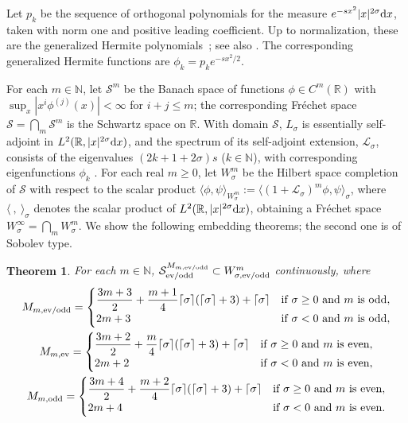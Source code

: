 \documentclass[11pt]{article}
\newtheorem{Theorem}{Theorem}[section]
\newcommand{\R}{\mathbb{R}}
\newcommand{\N}{\mathbb{N}}
\newcommand{\LL}{\mathcal{L}}
\renewcommand{\SS}{\mathcal{S}}
\begin{document}
Let $p_k$ be the sequence of orthogonal polynomials for the measure $e^{-sx^2}|x|^{2\sigma}{\rm d}x$, taken with norm one and positive leading coef\/f\/icient. Up to normalization, these are the generalized Hermite polynomials~\cite[p.~380, Problem~25]{Szego1975}; see also \cite{Chihara1955,Chihara1978,DickinsonWarsi1963,DuttaChatterjeaMore1975,Rosenblum1994,Rosler1998}. The corresponding generalized Hermite functions are $\phi_k=p_ke^{-sx^2/2}$.

For each $m\in\N$, let $\SS^m$ be the Banach space of functions $\phi\in C^m(\R)$ with \mbox{$\sup_x|x^i\phi^{(j)}(x)|\!<\!\infty$} for $i+j\le m$; the corresponding Fr\'echet space $\SS=\bigcap_m\SS^m$ is the Schwartz space on $\R$. With domain $\SS$, $L_\sigma$ is essentially self-adjoint in $L^2(\R,|x|^{2\sigma}{\rm d}x)$, and the spectrum of its self-adjoint extension, $\LL_\sigma$, consists of the eigenvalues $(2k+1+2\sigma)s$ ($k\in\N$), with corresponding eigenfunctions $\phi_k$  \cite{Rosenblum1994}. For each real $m\ge0$, let $W_\sigma^m$ be the Hilbert space completion of $\SS$ with respect to the scalar product $\langle\phi,\psi\rangle_{W_\sigma^m}:=\langle(1+\LL_\sigma)^m\phi,\psi\rangle_\sigma$, where $\langle\ ,\ \rangle_\sigma$ denotes the scalar product of $L^2(\R,|x|^{2\sigma}{\rm d}x)$, obtaining a Fr\'echet space $W_\sigma^\infty=\bigcap_mW_\sigma^m$. We show the following embedding theorems; the second one is of Sobolev type.


\begin{Theorem}\label{t:SS^m' subset W_sigma^m}
  For each $m\in\N$, $\SS_{\text{\rm ev/odd}}^{M_{m,\text{\rm ev/odd}}}\subset W_{\sigma,\text{\rm ev/odd}}^m$ continuously, where
    \begin{gather*}
      M_{m,\text{\rm ev/odd}} =
        \begin{cases}
          \dfrac{3m+3}{2}+\dfrac{m+1}{4} \lceil\sigma\rceil(\lceil\sigma\rceil+3)+\lceil\sigma\rceil & \text{if $\sigma\ge0$ and $m$ is odd},\\
          2m+3 & \text{if $\sigma<0$ and $m$ is odd} ,
        \end{cases}
      \\
      M_{m,\text{\rm ev}} =
        \begin{cases}
          \dfrac{3m+2}{2}+\dfrac{m}{4} \lceil\sigma\rceil(\lceil\sigma\rceil+3)+\lceil\sigma\rceil & \text{if $\sigma\ge0$ and $m$ is even},\\
          2m+2 & \text{if $\sigma<0$ and $m$ is even} ,
        \end{cases}
      \\
      M_{m,\text{\rm odd}} =
        \begin{cases}
          \dfrac{3m+4}{2}+\dfrac{m+2}{4} \lceil\sigma\rceil(\lceil\sigma\rceil+3)+\lceil\sigma\rceil & \text{if $\sigma\ge0$ and $m$ is even},\\
          2m+4 & \text{if $\sigma<0$ and $m$ is even}.
        \end{cases}
    \end{gather*}
\end{Theorem}
\end{document}
